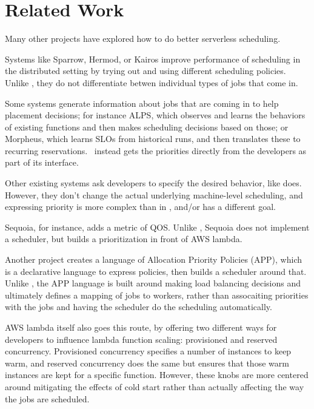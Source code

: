 \section{Related Work}

Many other projects have explored how to do better serverless scheduling.
 
Systems like Sparrow\cite{TODO}, Hermod\cite{TODO}, or Kairos\cite{TODO} improve
performance of scheduling in the distributed setting by trying out and using
different scheduling policies. Unlike \sys{}, they do not differentiate betwen
individual types of jobs that come in.


Some systems generate information about jobs that are coming in to help
placement decisions; for instance ALPS\cite{TODO}, which observes and learns the
behaviors of existing functions and then makes scheduling decisions based on
those; or Morpheus\cite{TODO}, which learns SLOs from historical runs, and then
translates these to recurring reservations.\ \sys{} instead gets the priorities
directly from the developers as part of its interface.


Other existing systems ask developers to specify the desired behavior, like
\sys{} does. However, they don't change the actual underlying machine-level
scheduling, and expressing priority is more complex than in \sys{}, and/or has a
different goal.

Sequoia\cite{TODO}, for instance, adds a metric of QOS. Unlike \sys{}, Sequoia
does not implement a scheduler, but builds a prioritization in front of AWS
lambda. 

Another project\cite{TODO} creates a language of Allocation Priority Policies
(APP), which is a declarative language to express policies, then builds a
scheduler around that. Unlike \sys{}, the APP language is built around making
load balancing decisions and ultimately defines a mapping of jobs to workers,
rather than assocaiting priorities with the jobs and having the scheduler do the
scheduling automatically.

AWS lambda itself also goes this route, by offering two different ways for
developers to influence lambda function scaling: provisioned and reserved
concurrency. Provisioned concurrency specifies a number of instances to keep
warm, and reserved concurrency does the same but ensures that those warm
instances are kept for a specific function. However, these knobs are more
centered around mitigating the effects of cold start rather than actually
affecting the way the  jobs are scheduled.
